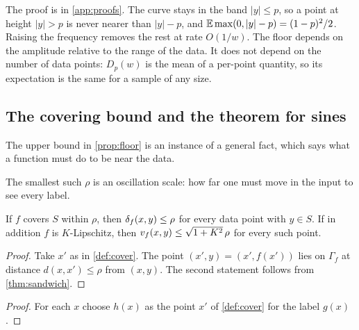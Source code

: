 The proof is in \cref{app:proofs}. The curve stays in the band $|y|\le p$, so a
point at height $|y|>p$ is never nearer than $|y|-p$, and
$\mathbb{E}\max(0,|y|-p)=(1-p)^2/2$. Raising the frequency removes the rest at rate
$O(1/w)$. The floor depends on the amplitude relative to the range of the data.
It does not depend on the number of data points: $D_p(w)$ is the mean of a
per-point quantity, so its expectation is the same for a sample of any size.

\subsection{The covering bound and the theorem for sines}
\label{sec:cover}

The upper bound in \cref{prop:floor} is an instance of a general fact, which
says what a function must do to be near the data.


The smallest such $\rho$ is an oscillation scale: how far one must move in the
input to see every label.

\begin{theorem}\label{thm:cover}
If $f$ covers $S$ within $\rho$, then $\delta_f(x,y)\le\rho$ for every data point
with $y\in S$. If in addition $f$ is $K$-Lipschitz, then
$v_f(x,y)\le\sqrt{1+K^2}\,\rho$ for every such point.
\end{theorem}

\begin{proof}
Take $x'$ as in \cref{def:cover}. The point $(x',y)=(x',f(x'))$ lies on
$\Gamma_f$ at distance $d(x,x')\le\rho$ from $(x,y)$. The second statement
follows from \cref{thm:sandwich}.
\end{proof}


\begin{proof}
For each $x$ choose $h(x)$ as the point $x'$ of \cref{def:cover} for the label
$g(x)$.
\end{proof}

